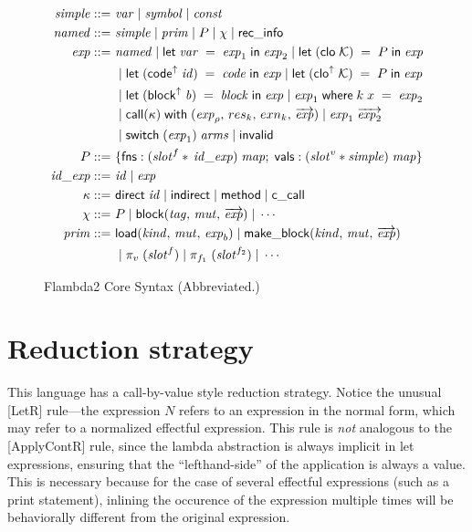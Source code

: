 \documentclass[11pt,fleqn]{amsart}
\begin{document}
\begin{figure}[ht]
  \begin{align*}
    \mathit{simple} ::=~& \mathit{var} \; | \; \mathit{symbol} \; | \; \mathit{const} \\
    \mathit{named} ::=~& \mathit{simple} \; | \; \mathit{prim} \; | \; P \; | \; \chi \; | \; \mathsf{rec\_info} \\
    \mathit{exp} ::=~& \mathit{named} \; | \; \mathsf{let}\; \mathit{var} \; = \; \mathit{exp}_1 \; \mathsf{in} \; \mathit{exp}_2 \; | \; \mathsf{let}\; (\mathsf{clo} \; \mathcal{K}) \; = \; P \; \mathsf{in} \; \mathit{exp}\\
    & \; | \; \mathsf{let}\; (\mathsf{code}^{\uparrow} \; \mathit{id}) \; = \; \mathit{code} \; \mathsf{in} \; \mathit{exp} \; | \; \mathsf{let}\; (\mathsf{clo}^{\uparrow} \; \mathcal{K}) \; = \; P \; \mathsf{in} \; \mathit{exp} \\
    & \; | \; \mathsf{let}\; (\mathsf{block}^{\uparrow} \; \mathit{b}) \; = \; \mathit{block} \; \mathsf{in} \; \mathit{exp} \; | \; \mathit{exp}_1 \; \mathsf{where} \; k \; x \; = \; \mathit{exp}_2 \\
    & \; | \; \mathsf{call}(\kappa) \; \mathsf{with} \; (\mathit{exp}_{\rho}, \, res_k, \, exn_k, \, \overrightarrow{\mathit{exp}}) \; | \; \mathit{exp}_1 \; \overrightarrow{\mathit{exp}_2} \\
    & \; | \; \mathsf{switch}\; (\mathit{exp}_1) \; \mathit{arms} \; | \; \mathsf{invalid} \\
    P ::=~& \{ \mathsf{fns} : (\mathit{slot}^{f} \ast \, \mathit{id\_exp} ) \; \mathit{map} ; \;
    \mathsf{vals} : (\mathit{slot}^{v} \ast \mathit{simple}) \; \mathit{map} \}\\
    \mathit{id\_exp} ::=~& \mathit{id} \; | \; \mathit{exp} \\
    \kappa ::=~& \mathsf{direct} \; \mathit{id} \; | \; \mathsf{indirect} \; | \; \mathsf{method} \; | \; \mathsf{c\_call} \\
    \chi ::=~& P \; | \; \mathsf{block}(\mathit{tag},\,\mathit{mut},\,\overrightarrow{\mathit{exp}}) \; | \; \cdots \\
    \mathit{prim} ::=~& \mathsf{load}(\mathit{kind},\,\mathit{mut},\,\mathit{exp}_b) \; | \; \mathsf{make\_block}(\mathit{kind},\,\mathit{mut},\,\overrightarrow{\mathit{exp}}) \\
    & \; | \; \pi_{v} \; (\mathit{slot}^{f}) \; | \; \pi_{f_1} \; (\mathit{slot}^{f_2}) \; | \; \cdots
  \end{align*}
  \caption{Flambda2 Core Syntax (Abbreviated.) }
  \label{fig:syntax}
\end{figure}



\section{Reduction strategy}



This language has a call-by-value style reduction strategy.
Notice the unusual [LetR] rule---the expression $N$ refers to an expression in
the normal form, which may refer to a normalized effectful expression.
This rule is \textit{not} analogous to the [ApplyContR] rule, since the
lambda abstraction is always implicit in let expressions, ensuring that the
``lefthand-side'' of the application is always a value. This is necessary
because for the case of several effectful expressions (such as a print
statement), inlining the occurence of the expression multiple times will be
behaviorally different from the original expression.
\end{document}

